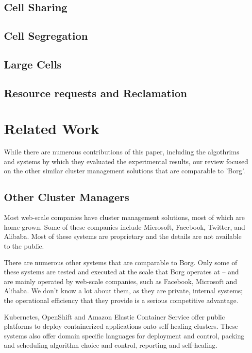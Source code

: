 \documentclass[runningheads,a4paper]{llncs}
\begin{document}
\subsection{Cell Sharing} 

\subsection{Cell Segregation} 

\subsection{Large Cells}

\subsection{Resource requests and Reclamation}

\section{Related Work}
While there are numerous contributions of this paper, including the algothrims and systems by which they evaluated the experimental results, our review focused on the other similar cluster management solutions that are comparable to 'Borg'.

\subsection{Other Cluster Managers}
Most web-scale companies have cluster management solutions, most of which are home-grown.  Some of these companies include Microsoft, Facebook, Twitter, and Alibaba.  Most of these systems are proprietary and the details are not available to the public.  

There are numerous other systems that are comparable to Borg.
Only some of these systems are tested and executed at the scale that Borg operates at -- and are mainly operated by web-scale companies, such as Facebook, Microsoft and Alibaba.  We don’t know a lot about them, as they are private, internal systems; the operational efficiency that they provide is a serious competitive advantage.

Kubernetes, OpenShift and Amazon Elastic Container Service offer public platforms to deploy containerized applications onto self-healing clusters.  These systems also offer domain specific languages for deployment and control, packing and scheduling algorithm choice and control, reporting and self-healing. 
\end{document}
